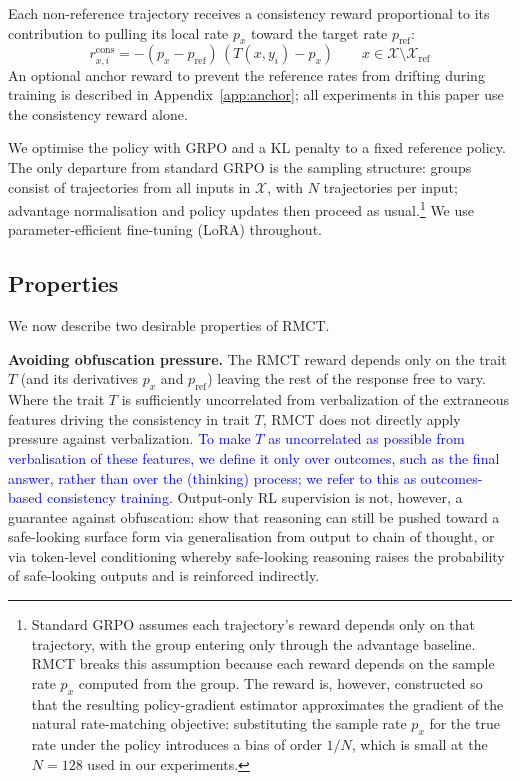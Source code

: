 \documentclass{article}
\begin{document}
Each non-reference trajectory receives a consistency reward proportional to its
contribution to pulling its local rate $p_x$ toward the target rate
$p_{\text{ref}}$:
\begin{equation}\label{eq:reward}
r^{\text{cons}}_{x,i} = -(p_x - p_{\text{ref}})\,(T(x, y_i) - p_x)
\qquad x \in \mathcal{X} \setminus \mathcal{X}_{\text{ref}}
\end{equation}
An optional anchor reward to prevent the reference rates from drifting
during training is described in Appendix~\ref{app:anchor}; all experiments
in this paper use the consistency reward alone.

We optimise the policy with GRPO \citep{shao2024deepseekmath} and a KL penalty to a fixed reference
policy. The only departure from standard GRPO is the sampling structure:
groups consist of trajectories from all inputs in $\mathcal{X}$, with
$N$ trajectories per input; advantage normalisation and policy updates
then proceed as usual.\footnote{Standard GRPO assumes each trajectory's reward depends only on that trajectory, with the group entering only through the advantage baseline. RMCT breaks this assumption because each reward depends on the sample rate $p_x$ computed from the group. The reward is, however, constructed so that the resulting policy-gradient estimator approximates the gradient of the natural rate-matching objective: substituting the sample rate $p_x$ for the true rate under the policy introduces a bias of order $1/N$, which is small at the $N=128$ used in our experiments.} We use parameter-efficient fine-tuning (LoRA)
throughout.

\subsection{Properties}

We now describe two desirable properties of RMCT.

\textbf{Avoiding obfuscation pressure.}
The RMCT reward depends only on the trait $T$ (and its derivatives $p_x$ and $p_{\text{ref}}$) leaving the rest of the response free to vary. Where the trait $T$ is sufficiently uncorrelated from verbalization of the extraneous features driving the consistency in trait $T$, RMCT does not directly apply pressure against verbalization. \textcolor{blue}{To make $T$ as uncorrelated as possible from verbalisation of these features, we define it only over outcomes, such as the final answer, rather than over the (thinking) process; we refer to this as outcomes-based consistency training.} Output-only RL supervision is not, however, a guarantee against obfuscation: \citet{drori2025outputsupervisionobfuscatechain} show that reasoning can still be pushed toward a safe-looking surface form via generalisation from output to chain of thought, or via token-level conditioning whereby safe-looking reasoning raises the probability of safe-looking outputs and is reinforced indirectly.
\end{document}
